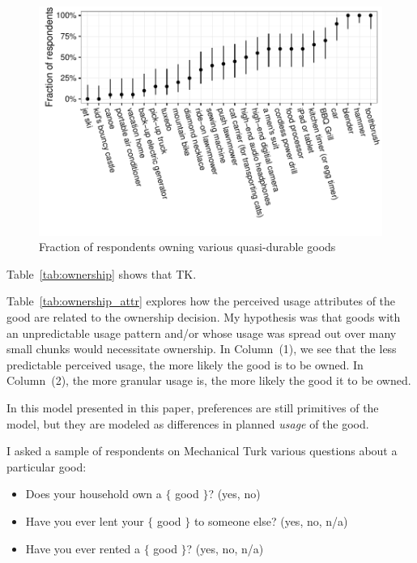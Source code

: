 \documentclass[11pt]{article}
\begin{document}
\begin{figure}
\centering 
\caption{Fraction of respondents owning various quasi-durable goods}
\begin{minipage}{0.90 \linewidth}
\includegraphics[width = \linewidth]{./plots/ownership_fractions.pdf} 
\end{minipage} 
\end{figure} 

Table~\ref{tab:ownership} shows that TK. 



Table~\ref{tab:ownership_attr} explores how the perceived usage attributes of the good are related to the ownership decision.
My hypothesis was that goods with an unpredictable usage pattern and/or whose usage was spread out over many small chunks would necessitate ownership. 
In Column~(1), we see that the less predictable perceived usage, the more likely the good is to be owned. 
In Column~(2), the more granular usage is, the more likely the good it to be owned. 

 

In this model presented in this paper, preferences are still primitives of the model, but they are modeled as differences in planned \emph{usage} of the good.  

\cite{kuziemko2013elastic} 

I asked a sample of respondents on Mechanical Turk various questions about a particular good: 
\begin{itemize} 
\item Does your household own a $\{$ good $\}$? (yes, no) 
\item Have you ever lent your $\{$ good $\}$ to someone else? (yes, no, n/a)
\item Have you ever rented a $\{$ good $\}$? (yes, no, n/a)
\end{itemize}  
\end{document}

